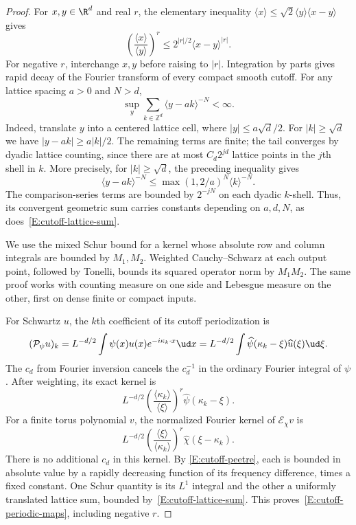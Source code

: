 \begin{proof}
  For $x,y \in \R^d$ and real $r$, the elementary inequality
  $\langle x\rangle\le\sqrt{2}\langle y\rangle\langle x-y\rangle$ gives
  \begin{equation}\label{E:cutoff-peetre}
    \left(\frac{\langle x\rangle}{\langle y\rangle}\right)^r
    \le 2^{|r|/2}\langle x-y\rangle^{|r|}.
  \end{equation}
  For negative $r$, interchange $x,y$ before raising to $|r|$. Integration
  by parts gives rapid decay of the Fourier transform of every compact
  smooth cutoff. For any lattice spacing $a > 0$ and $N > d$,
  \begin{equation}\label{E:cutoff-lattice-sum}
    \sup_y\sum_{k\in\mathbb Z^d}\langle y-ak\rangle^{-N}<\infty.
  \end{equation}
  Indeed, translate $y$ into a centered lattice cell, where
  $|y|\le a\sqrt d/2$. For $|k|\ge\sqrt d$ we have
  $|y-ak|\ge a|k|/2$. The remaining terms are finite; the tail converges
  by dyadic lattice counting, since there are at most $C_d2^{jd}$ lattice
  points in the $j$th shell in $k$. More precisely, for
  $|k|\ge\sqrt d$, the preceding inequality gives
  \[
    \langle y-ak\rangle^{-N}
    \le \max(1,2/a)^N\langle k\rangle^{-N}.
  \]
  The comparison-series terms are bounded by $2^{-jN}$ on each dyadic
  $k$-shell. Thus, its convergent geometric sum carries constants depending
  on $a,d,N$, as does~\eqref{E:cutoff-lattice-sum}.

  We use the mixed Schur bound for a kernel whose absolute row and column
  integrals are bounded by $M_1,M_2$. Weighted Cauchy--Schwarz at each
  output point, followed by Tonelli, bounds its squared operator norm by
  $M_1M_2$. The same proof works with counting measure on one side and
  Lebesgue measure on the other, first on dense finite or compact inputs.

  For Schwartz $u$, the $k$th coefficient of its cutoff periodization is
  \[
    (\mathcal P_\psi u)_k
    = L^{-d/2}\int\psi(x)u(x)e^{-i\kappa_k\cdot x}\ud x
    = L^{-d/2}\int\widehat\psi(\kappa_k-\xi)\widehat u(\xi)\ud\xi.
  \]
  The $c_d$ from Fourier inversion cancels the $c_d^{-1}$ in the ordinary
  Fourier integral of $\psi$. After weighting, its exact kernel is
  \[
    L^{-d/2}\left(\frac{\langle\kappa_k\rangle}{\langle\xi\rangle}\right)^r
    \widehat\psi(\kappa_k-\xi).
  \]
  For a finite torus polynomial $v$, the normalized Fourier kernel of
  $\mathcal E_\chi v$ is
  \[
    L^{-d/2}\left(\frac{\langle\xi\rangle}{\langle\kappa_k\rangle}\right)^r
    \widehat\chi(\xi-\kappa_k).
  \]
  There is no additional $c_d$ in this kernel. By
  \eqref{E:cutoff-peetre}, each is bounded in absolute value by a rapidly
  decreasing function of its frequency difference, times a fixed constant.
  One Schur quantity is its $L^1$ integral and the other a uniformly
  translated lattice sum, bounded by~\eqref{E:cutoff-lattice-sum}.
  This proves~\eqref{E:cutoff-periodic-maps}, including negative $r$.


\end{proof}
